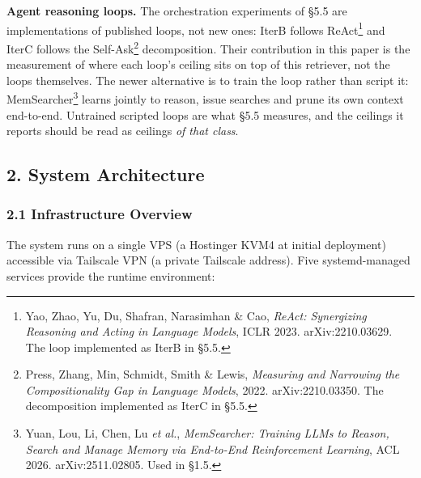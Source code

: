 \documentclass[
]{article}
\begin{document}
\textbf{Agent reasoning loops.} The orchestration experiments of §5.5
are implementations of published loops, not new ones: IterB follows
ReAct\footnote{Yao, Zhao, Yu, Du, Shafran, Narasimhan \& Cao,
  \emph{ReAct: Synergizing Reasoning and Acting in Language Models},
  ICLR 2023. arXiv:2210.03629. The loop implemented as IterB in §5.5.}
and IterC follows the Self-Ask\footnote{Press, Zhang, Min, Schmidt,
  Smith \& Lewis, \emph{Measuring and Narrowing the Compositionality Gap
  in Language Models}, 2022. arXiv:2210.03350. The decomposition
  implemented as IterC in §5.5.} decomposition. Their contribution in
this paper is the measurement of where each loop's ceiling sits on top
of this retriever, not the loops themselves. The newer alternative is to
train the loop rather than script it: MemSearcher\footnote{Yuan, Lou,
  Li, Chen, Lu \emph{et al.}, \emph{MemSearcher: Training LLMs to
  Reason, Search and Manage Memory via End-to-End Reinforcement
  Learning}, ACL 2026. arXiv:2511.02805. Used in §1.5.} learns jointly
to reason, issue searches and prune its own context end-to-end.
Untrained scripted loops are what §5.5 measures, and the ceilings it
reports should be read as ceilings \emph{of that class}.

\subsection{2. System Architecture}\label{system-architecture}

\subsubsection{2.1 Infrastructure
Overview}\label{infrastructure-overview}

The system runs on a single VPS (a Hostinger KVM4 at initial deployment)
accessible via Tailscale VPN (a private Tailscale address). Five
systemd-managed services provide the runtime environment:
\end{document}
